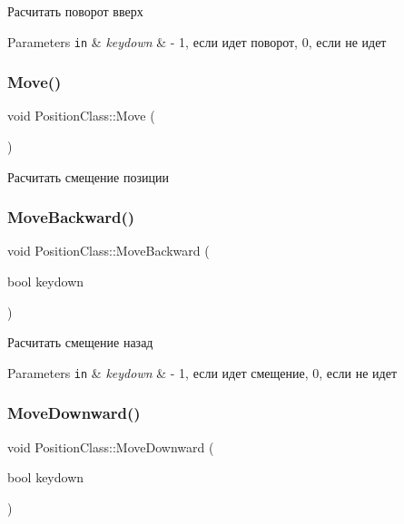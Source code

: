 Расчитать поворот вверх 


\begin{DoxyParams}[1]{Parameters}
\mbox{\tt in}  & {\em keydown} & -\/ 1, если идет поворот, 0, если не идет \\
\hline
\end{DoxyParams}
\mbox{\label{class_position_class_ac0870f878bebd15005ebfc010a60c397}} 
\subsubsection{\texorpdfstring{Move()}{Move()}}
{\footnotesize\ttfamily void Position\+Class\+::\+Move (\begin{DoxyParamCaption}{ }\end{DoxyParamCaption})}



Расчитать смещение позиции 

\mbox{\label{class_position_class_a76269efeeb56583019ae5c90a7b38b64}} 
\subsubsection{\texorpdfstring{Move\+Backward()}{MoveBackward()}}
{\footnotesize\ttfamily void Position\+Class\+::\+Move\+Backward (\begin{DoxyParamCaption}\item[{bool}]{keydown }\end{DoxyParamCaption})}



Расчитать смещение назад 


\begin{DoxyParams}[1]{Parameters}
\mbox{\tt in}  & {\em keydown} & -\/ 1, если идет смещение, 0, если не идет \\
\hline
\end{DoxyParams}
\mbox{\label{class_position_class_a44c53730208a688ec5f1fbcbf358a848}} 
\subsubsection{\texorpdfstring{Move\+Downward()}{MoveDownward()}}
{\footnotesize\ttfamily void Position\+Class\+::\+Move\+Downward (\begin{DoxyParamCaption}\item[{bool}]{keydown }\end{DoxyParamCaption})}




